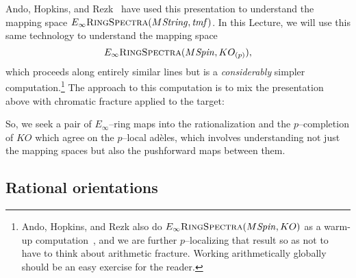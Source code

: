 Ando, Hopkins, and Rezk~\cite{AHR} have used this presentation to understand the mapping space \(E_\infty\normalfont\textsc{RingSpectra}(M\mathit{String}, \mathit{tmf})\).  In this Lecture, we will use this same technology to understand the mapping space \[E_\infty\normalfont\textsc{RingSpectra}(M\mathit{Spin}, KO_{(p)}),\] which proceeds along entirely similar lines but is a \emph{considerably} simpler computation.\footnote{Ando, Hopkins, and Rezk also do \(E_\infty\normalfont\textsc{RingSpectra}(M\mathit{Spin}, KO)\) as a warm-up computation~\cite[Section 7]{AHR}, and we are further \(p\)--localizing that result so as not to have to think about arithmetic fracture.  Working arithmetically globally should be an easy exercise for the reader.}  The approach to this computation is to mix the presentation above with chromatic fracture applied to the target:
\begin{center}
\end{center}
So, we seek a pair of \(E_\infty\)--ring maps into the rationalization and the \(p\)--completion of \(KO\) which agree on the \(p\)--local ad\`eles, which involves understanding not just the mapping spaces but also the pushforward maps between them.





\subsection{Rational orientations}

